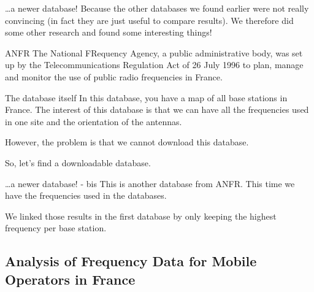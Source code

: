 \begin{frame}{\dots a newer database!}
    Because the other databases we found earlier were not really convincing (in fact they are just useful to compare results).
    We therefore did some other research and found some interesting things!

    \begin{block}{ANFR}
        The National FRequency Agency, a public administrative body, was set up by the Telecommunications Regulation Act of 26 July 1996
        to plan, manage and monitor the use of public radio frequencies in France.
    \end{block}

    \begin{block}{The database itself}
        In this database\footnotemark, you have a map of all base stations in France. The interest of this database is that we can have all the frequencies used in one site and the orientation of the antennas.

        However, the problem is that we cannot download this database.
    \end{block}

    So, let's find a downloadable database.

\end{frame}

\begin{frame}{\dots a newer database! - bis}
    This is another database from ANFR. This time we have the frequencies used in the databases.
    
    We linked those results in the first database by only keeping the highest frequency per base station.
\end{frame}

\subsection{Analysis of Frequency Data for Mobile Operators in France}
\insertsubsectionframe

